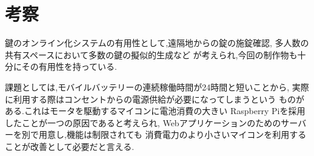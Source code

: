 \section{考察}\label{sec:consideration}
鍵のオンライン化システムの有用性として,遠隔地からの錠の施錠確認,
多人数の共有スペースにおいて多数の鍵の擬似的生成など
が考えられ,今回の制作物も十分にその有用性を持っている.

課題としては,モバイルバッテリーの連続稼働時間が24時間と短いことから,
実際に利用する際はコンセントからの電源供給が必要になってしまうという
ものがある.これはモータを駆動するマイコンに電池消費の大きい
Raspberry Piを採用したことが一つの原因であると考えられ,
Webアプリケーションのためのサーバーを別で用意し,機能は制限されても
消費電力のより小さいマイコンを利用することが改善として必要だと言える.


